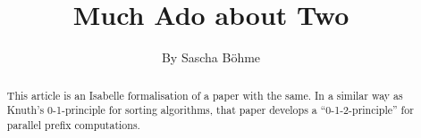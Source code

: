\documentclass[11pt,a4paper]{article}
\begin{document}
\title{Much Ado about Two}
\author{By Sascha B\"ohme}
\maketitle

\begin{abstract}
This article is an Isabelle formalisation of a paper with the same.
In a similar way as Knuth's 0-1-principle for sorting algorithms, that paper
develops a ``0-1-2-principle'' for parallel prefix computations.
\end{abstract}

\tableofcontents






\end{document}
